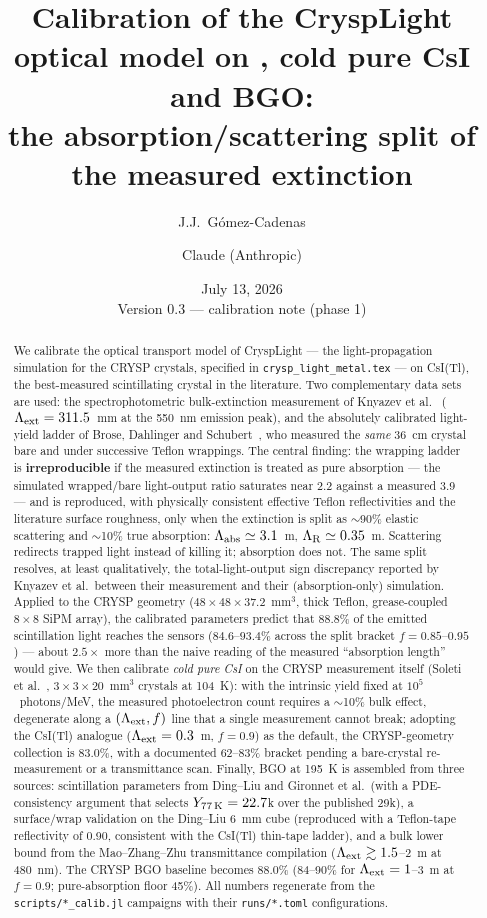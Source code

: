 \documentclass[11pt,a4paper]{article}
\title{Calibration of the CryspLight optical model on \csitl{}, cold pure CsI and BGO:\\
the absorption/scattering split of the measured extinction}
\author{J.J.~G\'omez-Cadenas \and Claude (Anthropic)}
\date{July 13, 2026 \\[2mm] \small Version 0.3 --- calibration note (phase 1)}
\newcommand{\csitl}{CsI(Tl)}
\newcommand{\lext}{\Lambda_{\rm ext}}
\newcommand{\labs}{\Lambda_{\rm abs}}
\newcommand{\lray}{\Lambda_{\rm R}}
\begin{document}
\maketitle

\begin{abstract}
We calibrate the optical transport model of CryspLight --- the light-propagation
simulation for the CRYSP crystals, specified in \texttt{crysp\_light\_metal.tex} --- on
\csitl{}, the best-measured scintillating crystal in the literature. Two complementary
data sets are used: the spectrophotometric bulk-extinction measurement of Knyazev et
al.~\cite{knyazev2021} ($\lext = 311.5$~mm at the 550~nm emission peak), and the
absolutely calibrated light-yield ladder of Brose, Dahlinger and
Schubert~\cite{brose1998}, who measured the \emph{same} $36$~cm crystal bare and under
successive Teflon wrappings. The central finding: the wrapping ladder is
\textbf{irreproducible} if the measured extinction is treated as pure absorption --- the
simulated wrapped/bare light-output ratio saturates near 2.2 against a measured 3.9 ---
and is reproduced, with physically consistent effective Teflon reflectivities and the
literature surface roughness, only when the extinction is split as $\sim$90\% elastic
scattering and $\sim$10\% true absorption: $\labs \simeq 3.1$~m, $\lray \simeq 0.35$~m.
Scattering redirects trapped light instead of killing it; absorption does not. The same
split resolves, at least qualitatively, the total-light-output sign discrepancy reported
by Knyazev et al.\ between their measurement and their (absorption-only) simulation.
Applied to the CRYSP geometry ($48\times48\times37.2$~mm$^3$, thick Teflon, grease-coupled
$8\times8$ SiPM array), the calibrated parameters predict that $88.8\%$ of the emitted
scintillation light reaches the sensors ($84.6$--$93.4\%$ across the split bracket
$f = 0.85$--$0.95$) --- about $2.5\times$ more than the naive reading of the measured
``absorption length'' would give.
We then calibrate \emph{cold pure CsI} on the CRYSP measurement itself
(Soleti et al.~\cite{soleti2024}, $3\times3\times20$~mm$^3$ crystals at 104~K): with the
intrinsic yield fixed at $10^5$~photons/MeV, the measured photoelectron count requires a
$\sim$10\% bulk effect, degenerate along a $(\lext, f)$ line that a single measurement
cannot break; adopting the \csitl{} analogue ($\lext = 0.3$~m, $f = 0.9$) as the default,
the CRYSP-geometry collection is $83.0\%$, with a documented 62--83\% bracket pending a
bare-crystal re-measurement or a transmittance scan.
Finally, BGO at 195~K is assembled from three sources: scintillation parameters from
Ding--Liu and Gironnet et al.\ (with a PDE-consistency argument that selects
$Y_{77\,\rm K} = 22.7$k over the published 29k), a surface/wrap validation on the
Ding--Liu 6~mm cube (reproduced with a Teflon-tape reflectivity of 0.90, consistent
with the \csitl{} thin-tape ladder), and a bulk lower bound from the Mao--Zhang--Zhu
transmittance compilation ($\lext \gtrsim 1.5$--2~m at 480~nm). The CRYSP BGO baseline
becomes $88.0\%$ (84--90\% for $\lext = 1$--3~m at $f = 0.9$; pure-absorption floor
45\%). All numbers regenerate from the \texttt{scripts/*\_calib.jl} campaigns with
their \texttt{runs/*.toml} configurations.
\end{abstract}
\end{document}
